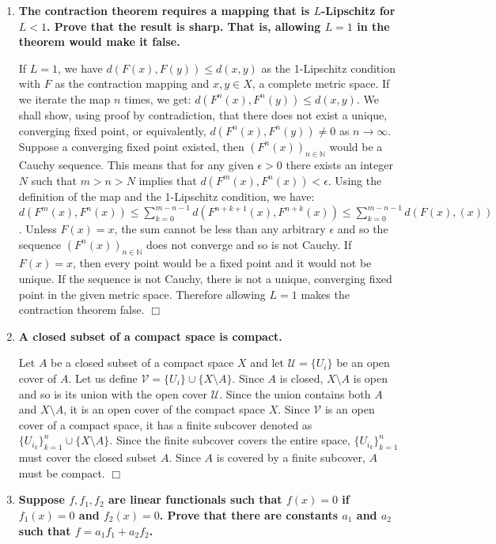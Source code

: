\documentclass[12pt,letterpaper,reqno]{amsart}
\newcommand{\N}{\mathbb N}
\begin{document}
\begin{enumerate}[1.]
\item  \textbf{The contraction theorem requires a mapping that is $L$-Lipschitz for $L<1$. Prove that the result is sharp. That is, allowing $L=1$ in the theorem would make it false.}
\begin{flushleft}
    If $L=1$, we have $d(F(x),F(y)) \leq d(x,y)$ as the 1-Lipschitz condition with $F$ as the contraction mapping and $x,y \in X$, a complete metric space. If we iterate the map $n$ times, we get: $d(F^n(x),F^n(y)) \leq d(x,y)$. We shall show, using proof by contradiction, that there does not exist a unique, converging fixed point, or equivalently, $d(F^n(x),F^n(y)) \not= 0$ as $n \rightarrow \infty$. Suppose a converging fixed point existed, then $(F^n(x))_{n\in\N}$ would be a Cauchy sequence. This means that for any given $\epsilon > 0$ there exists an integer $N$ such that $m>n>N$ implies that $d(F^m(x),F^n(x)) < \epsilon$. Using the definition of the map and the 1-Lipschitz condition, we have: $d \left(F^{m}(x),F^{n}(x)\right) \leq \sum\limits_{k=0}^{m-n-1} d \left(F^{n+k+1}(x), F^{n+k}(x) \right) \leq \sum\limits_{k=0}^{m-n-1} d(F(x),(x))$. Unless $F(x) = x$, the sum cannot be less than any arbitrary $\epsilon$ and so the sequence $(F^n(x))_{n\in\N}$ does not converge and so is not Cauchy. If $F(x) = x$, then every point would be a fixed point and it would not be unique. If the sequence is not Cauchy, there is not a unique, converging fixed point in the given metric space. Therefore allowing $L=1$ makes the contraction theorem false. $\Box$
\end{flushleft}
\item \textbf{A closed subset of a compact space is compact.}
\begin{flushleft}
    Let $A$ be a closed subset of a compact space $X$ and let $\mathcal{U} = \{U_i\}$ be an open cover of $A$. Let us define $\mathcal{V} = \{U_i\} \cup \{X\setminus A\}$. Since $A$ is closed, $X\setminus A$ is open and so is its union with the open cover $\mathcal{U}$. Since the union contains both $A$ and $X\setminus A$, it is an open cover of the compact space $X$. Since $\mathcal{V}$ is an open cover of a compact space, it has a finite subcover denoted as $\{U_{i_k}\}_{k=1}^n \cup \{X\setminus A\}$. Since the finite subcover covers the entire space, $\{U_{i_k}\}_{k=1}^n$ must cover the closed subset $A$. Since $A$ is covered by a finite subcover, $A$ must be compact. $\Box$
\end{flushleft}
\item \textbf{Suppose $f, f_1, f_2$ are linear functionals such that $f(x)=0$ if $f_1(x)=0$ and $f_2(x)=0$. Prove that there are constants $a_1$ and $a_2$ such that $f=a_1 f_1+a_2f_2$.}

\end{enumerate}
\end{document}
